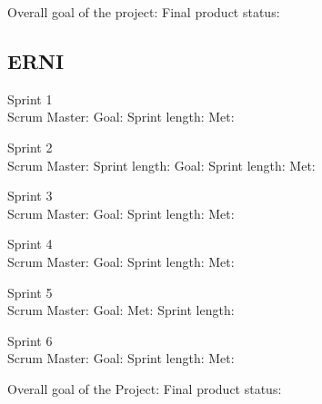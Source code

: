 Overall goal of the project:
Final product status:

\subsection {ERNI}

Sprint 1\\
Scrum Master:
Goal: 
Sprint length:
Met:

Sprint 2\\
Scrum Master:
Sprint length:
Goal: 
Sprint length:
Met:

Sprint 3\\
Scrum Master:
Goal: 
Sprint length:
Met:

Sprint 4\\
Scrum Master:
Goal: 
Sprint length:
Met:

Sprint 5\\
Scrum Master:
Goal: 
Met:
Sprint length:

Sprint 6\\
Scrum Master:
Goal: 
Sprint length:
Met:


Overall goal of the Project:
Final product status:
